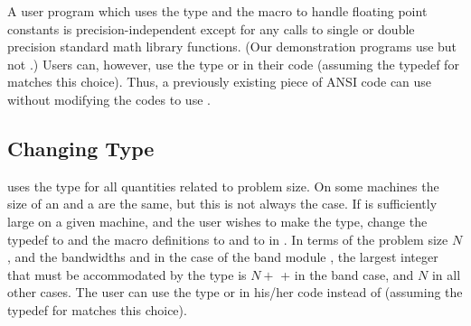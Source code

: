 A user program which uses the type  and the  macro
to handle floating point constants is precision-independent except for
any calls to single or double precision standard math library
functions.  (Our demonstration programs use  but not
.)  Users can, however, use the type  or
 in their code (assuming the typedef for  matches
this choice).  Thus, a previously existing piece of ANSI {\C} code can use
{\sundials} without modifying the codes to use .

\subsection{Changing Type }

{\sundials} uses the type  for all quantities related to problem
size.  On some machines the size of an  and a 
are the same, but this is not always the case. 
If  is sufficiently large on a given machine, and the user wishes
to make  the  type, change the typedef
 to 
and the macro definitions  
 to 
and
 to 
in .
In terms of the problem size $N$, and the bandwidths  and  
in the case of the band module {\band}, the largest integer that must be 
accommodated by the  type is $N + $  +  in the 
band case, and $N$ in all other cases. The user can use the type  
or  in his/her code instead of  (assuming the 
typedef for  matches this choice).